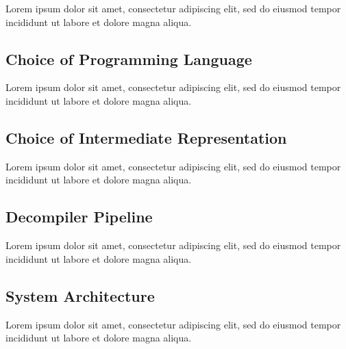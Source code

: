\documentclass[12pt, a4paper]{article}
\begin{document}
Lorem ipsum dolor sit amet, consectetur adipiscing elit, sed do eiusmod tempor incididunt ut labore et dolore magna aliqua.


\subsection{Choice of Programming Language}

Lorem ipsum dolor sit amet, consectetur adipiscing elit, sed do eiusmod tempor incididunt ut labore et dolore magna aliqua.




\subsection{Choice of Intermediate Representation}

Lorem ipsum dolor sit amet, consectetur adipiscing elit, sed do eiusmod tempor incididunt ut labore et dolore magna aliqua.


\subsection{Decompiler Pipeline}

Lorem ipsum dolor sit amet, consectetur adipiscing elit, sed do eiusmod tempor incididunt ut labore et dolore magna aliqua.


\subsection{System Architecture}

Lorem ipsum dolor sit amet, consectetur adipiscing elit, sed do eiusmod tempor incididunt ut labore et dolore magna aliqua.


\end{document}
